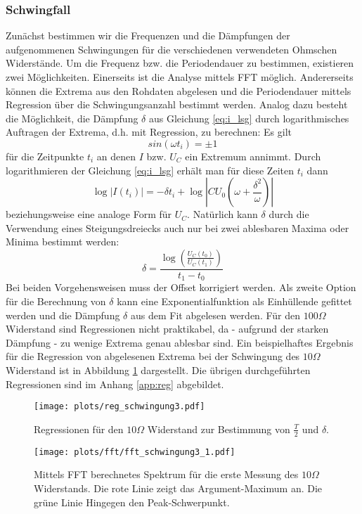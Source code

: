\documentclass[a4paper, 12pt]{scrartcl}
\begin{document}
\subsubsection{Schwingfall}
Zunächst bestimmen wir die Frequenzen und die Dämpfungen der aufgenommenen Schwingungen für die verschiedenen verwendeten Ohmschen Widerstände. Um die Frequenz bzw. die Periodendauer zu bestimmen, existieren zwei Möglichkeiten. Einerseits ist die Analyse mittels FFT möglich. Andererseits können die Extrema aus den Rohdaten abgelesen und die Periodendauer mittels Regression über die Schwingungsanzahl bestimmt werden.
Analog dazu besteht die Möglichkeit, die Dämpfung $\delta$ aus Gleichung \ref{eq:i_lsg} durch logarithmisches Auftragen der Extrema, d.h. mit Regression, zu berechnen: Es gilt
$$sin(\omega t_i) = \pm 1$$
für die Zeitpunkte $t_i$ an denen $I$ bzw. $U_C$ ein Extremum annimmt. Durch logarithmieren der Gleichung \ref{eq:i_lsg} erhält man für diese Zeiten $t_i$ dann
$$\log \lvert I(t_i)\rvert = -\delta t_i + \log\left\lvert CU_0 \left(\omega+\frac{\delta^2}{\omega}\right)\right\rvert$$
beziehungsweise eine analoge Form für $U_C$. Natürlich kann $\delta$ durch die Verwendung eines Steigungsdreiecks auch nur bei zwei ablesbaren Maxima oder Minima bestimmt werden:
$$\delta = \frac{\log\left(\frac{U_C(t_0)}{U_C(t_1)}\right)}{t_1-t_0}$$
Bei beiden Vorgehensweisen muss der Offset korrigiert werden. Als zweite Option für die Berechnung von $\delta$ kann eine Exponentialfunktion als Einhüllende gefittet werden und die Dämpfung $\delta$ aus dem Fit abgelesen werden.
Für den $100\Omega$ Widerstand sind Regressionen nicht praktikabel, da - aufgrund der starken Dämpfung - zu wenige Extrema genau ablesbar sind. Ein beispielhaftes Ergebnis für die Regression von abgelesenen Extrema bei der Schwingung des $10\Omega$ Widerstand ist in Abbildung \ref{abb:reg1} dargestellt. Die übrigen durchgeführten Regressionen sind im Anhang \ref{app:reg} abgebildet.

\begin{figure}[h]
\centering
\texttt{[image: plots/reg\_schwingung3.pdf]}
\caption{Regressionen für den $10\Omega$ Widerstand zur Bestimmung von $\frac{T}{2}$ und $\delta$.}
\label{abb:reg1}
\end{figure}

\begin{figure}[h]
\centering
\texttt{[image: plots/fft/fft\_schwingung3\_1.pdf]}
\caption{Mittels FFT berechnetes Spektrum für die erste Messung des $10\Omega$ Widerstands. Die rote Linie zeigt das Argument-Maximum an. Die grüne Linie Hingegen den Peak-Schwerpunkt.}
\label{abb:fft1}
\end{figure}
\end{document}

